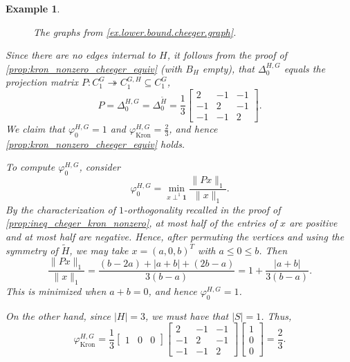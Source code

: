 \documentclass{article}
\newtheorem{example}{Example}[section]
\newcommand{\one}{\mathbf{1}}
\begin{document}
\begin{example}
\begin{figure}
\begin{subfigure}[b]{0.45\textwidth}
    \end{subfigure}
    \caption{The graphs from \cref{ex.lower.bound.cheeger.graph}.}
\label{fig.lowerbound.cheeger.graph.example}
\end{figure}
Since there are no edges internal to $H$, it follows from the proof of \cref{prop:kron_nonzero_cheeger_equiv} (with $B_H$ empty), that $\Delta_0^{H, G}$ equals the projection matrix $P\colon C_1^G\twoheadrightarrow C_1^{G,H}\subseteq C_1^G$,
\[P=\Delta_0^{H, G}=\Delta_0^{\widetilde{H}} = \frac{1}{3}\begin{bmatrix}
    2 & -1 & -1\\
    -1 & 2 & -1\\
    -1 & -1 & 2
\end{bmatrix}.\]
We claim that $\varphi_0^{H, G}=1$ and $\varphi_{\operatorname{Kron}}^{H, G}=\frac{2}{3}$,
and hence \cref{prop:kron_nonzero_cheeger_equiv} holds. 

To compute \(\varphi_0^{H,G}\), consider
\[
\varphi_0^{H,G}=\min_{x\perp^1\one}\frac{\|Px\|_1}{\|x\|_1}.
\]
By the characterization of \(1\)-orthogonality recalled in the proof of \cref{prop:ineq_cheger_kron_nonzero}, at most half of the entries of \(x\) are positive and at most half are negative. Hence, after permuting the vertices and using the symmetry of \(\widetilde H\), we may take \(x=(a,0,b)^T\) with \(a\leq 0\leq b\). Then
\[
\frac{\|Px\|_1}{\|x\|_1}
=
\frac{(b-2a)+|a+b|+(2b-a)}{3(b-a)}
=
1+\frac{|a+b|}{3(b-a)}.
\]
This is minimized when \(a+b=0\), and hence \(\varphi_0^{H,G}=1\).

On the other hand, since $|H|=3$,
we must have that $|S|=1$.
Thus,
\[\varphi_{\operatorname{Kron}}^{H, G}=
\frac{1}{3}\begin{bmatrix}
    1 & 0 & 0
\end{bmatrix}
\begin{bmatrix}
    2 & -1 & -1\\
    -1 & 2 & -1\\
    -1 & -1 & 2
\end{bmatrix}
\begin{bmatrix}
    1\\0\\0
\end{bmatrix}=
\frac{2}{3}.
\]
\end{example}
\end{document}
